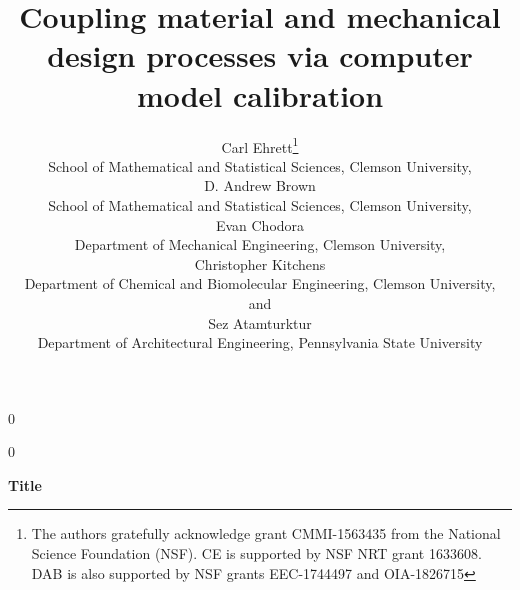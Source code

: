 \documentclass[12pt]{article}
\newcommand{\blind}{0}
\begin{document}
%

\def\spacingset#1{\renewcommand{\baselinestretch}%
{#1}\small\normalsize} \spacingset{1}



\blind
{
  \title{\bf Coupling material and mechanical design processes via computer model calibration}
  \author{Carl Ehrett\thanks{
    The authors gratefully acknowledge grant CMMI-1563435 from the National Science Foundation (NSF). CE is supported by NSF NRT grant 1633608. DAB is also supported by NSF grants EEC-1744497 and OIA-1826715}\hspace{.2cm}\\
    School of Mathematical and Statistical Sciences, Clemson University,\\
    D. Andrew Brown \\
    School of Mathematical and Statistical Sciences, Clemson University,\\
    Evan Chodora \\
    Department of Mechanical Engineering, Clemson University,\\
    Christopher Kitchens \\
    Department of Chemical and Biomolecular Engineering, Clemson University,\\
    and \\
    Sez Atamturktur \\
    Department of Architectural Engineering, Pennsylvania State University\\}
  \maketitle
} \fi

\blind
{
  \bigskip
  \bigskip
  \bigskip
  \begin{center}
    {\LARGE\bf Title}
\end{center}
  \medskip
} \fi
\end{document}

